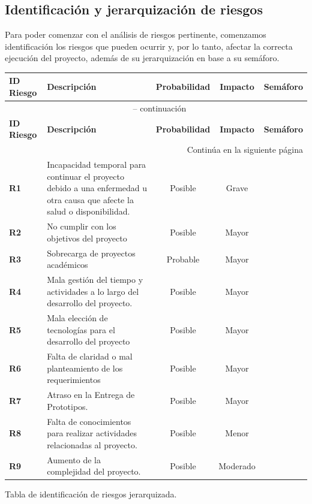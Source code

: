 \subsection{Identificación y jerarquización de riesgos}
Para poder comenzar con el análisis de riesgos pertinente, comenzamos identificación los riesgos que pueden ocurrir y, por lo tanto, afectar la correcta ejecución del proyecto, además de su jerarquización en base a su semáforo.

\begin{longtable}{|m{1.5cm}|m{4.5cm}|c|c|c|}
	\hline
	\rowcolor{black!75} \color{white} \textbf{ID Riesgo} & \color{white} \textbf{Descripción} & \color{white} \textbf{Probabilidad} & \color{white} \textbf{Impacto} & \color{white} \textbf{Semáforo} \\ 
	\hline
	\endfirsthead
	\multicolumn{5}{c}{{\tablename\ \thetable{} -- continuación}} \\
	\hline
	\rowcolor{black!75} \color{white} \textbf{ID Riesgo} & \color{white} \textbf{Descripción} & \color{white} \textbf{Probabilidad} & \color{white} \textbf{Impacto} & \color{white} \textbf{Semáforo} \\ 
	\hline
	\endhead
	\hline \multicolumn{5}{r}{{Continúa en la siguiente página}} \\
	\endfoot
	\hline
	\endlastfoot
	
	\textbf{R1} & Incapacidad temporal para continuar el proyecto debido a una enfermedad u otra causa que afecte la salud o disponibilidad. & Posible & Grave & \cellcolor{red!80} \\ 
	\hline
	\textbf{R2} & No cumplir con los objetivos del proyecto & Posible & Mayor & \cellcolor{red!80} \\ 
	\hline
	\textbf{R3} & Sobrecarga de proyectos académicos & Probable & Mayor & \cellcolor{red!80} \\ 
	\hline
	\textbf{R4} & Mala gestión del tiempo y actividades a lo largo del desarrollo del proyecto. & Posible & Mayor & \cellcolor{orange!80} \\ 
	\hline
	\textbf{R5} & Mala elección de tecnologías para el desarrollo del proyecto & Posible & Mayor & \cellcolor{orange!80} \\ 
	\hline
	\textbf{R6} & Falta de claridad o mal planteamiento de los requerimientos & Posible & Mayor & \cellcolor{orange!80} \\ 
	\hline
	\textbf{R7} & Atraso en la Entrega de Prototipos. & Posible & Mayor & \cellcolor{orange!80} \\ 
	\hline
	\textbf{R8} & Falta de conocimientos para realizar actividades relacionadas al proyecto. & Posible & Menor & \cellcolor{yellow!60} \\ 
	\hline
	\textbf{R9} & Aumento de la complejidad del proyecto. & Posible & Moderado & \cellcolor{yellow!60} \\ 
	\hline
\end{longtable}
\caption{Tabla de identificación de riesgos jerarquizada.} \label{tabla:riesgos}
\vspace{0.5cm}

